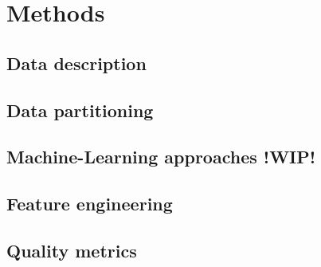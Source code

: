 \chapter{Methods}
\label{cha:Methods}


\section{Data description}



\section{Data partitioning}


\section{Machine-Learning approaches !WIP!}


\section{Feature engineering}


\section{Quality metrics}
